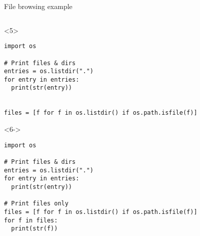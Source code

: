 \begin{frame}[fragile]{File browsing example}
\begin{columns}[onlytextwidth]
\begin{column}{\textwidth}
      \begin{onlyenv}<5>
        \begin{lstlisting}[style=python,basicstyle=\ttfamily\footnotesize]
import os

# Print files & dirs
entries = os.listdir(".")
for entry in entries:
  print(str(entry))


files = [f for f in os.listdir() if os.path.isfile(f)]

 \end{lstlisting}
      \end{onlyenv}

      \begin{onlyenv}<6->
        \begin{lstlisting}[style=python,basicstyle=\ttfamily\footnotesize]
import os

# Print files & dirs
entries = os.listdir(".")
for entry in entries:
  print(str(entry))

# Print files only
files = [f for f in os.listdir() if os.path.isfile(f)]
for f in files:
  print(str(f)) \end{lstlisting}
      \end{onlyenv}

    \end{column}
  \end{columns}

\end{frame}